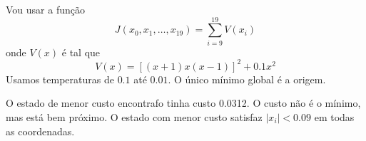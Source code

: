 \documentclass{homeworkclass}
\begin{document}
\begin{homeworkProblem}
	Vou usar a função
	\begin{equation}
	J(x_{0},x_1, \hdots, x_{19}) = \sum_{i = 9}^{19} V(x_{i})
	\end{equation}
	onde $V(x)$ é tal que
	\begin{equation}
	V(x) = \left[(x+1)x(x-1)\right]^{2} + 0.1x^{2}
	\end{equation}
Usamos temperaturas de $0.1$ até $0.01$. O único mínimo global é a origem.
\end{homeworkProblem}
O estado de menor custo encontrafo tinha custo 0.0312. O custo não é o mínimo, mas está bem próximo. O estado com menor custo satisfaz $|x_{i}| < 0.09$ em todas as coordenadas.
\end{document}
